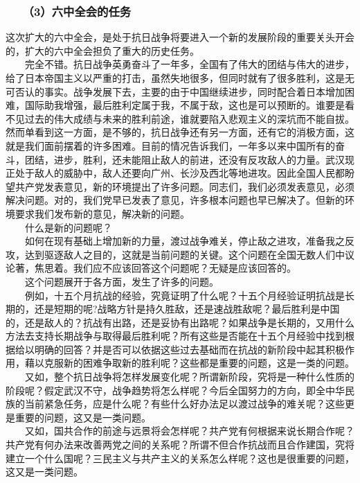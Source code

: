 \documentclass[cn,11pt,chinese]{elegantbook}
\def\myformat#1{\hfil\hfil #1}
\begin{document}
\subsubsection*{\myformat{　　（3）六中全会的任务}}
这次扩大的六中全会，是处于抗日战争将要进入一个新的发展阶段的重要关头开会的，扩大的六中全会担负了重大的历史任务。\\
　　完全不错。抗日战争英勇奋斗了一年多，全国有了伟大的团结与伟大的进步，给了日本帝国主义以严重的打击，虽然失地很多，但同时就有了很多胜利，这是无可否认的事实。战争发展下去，主要的由于中国继续进步，同时配合着日本增加困难，国际助我增强，最后胜利定属于我，不属于敌，这也是可以预断的。谁要是看不见过去的伟大成绩与未来的胜利前途，谁就要陷入悲观主义的深坑而不能自拔。然而单看到这一方面，是不够的，抗日战争还有另一方面，还有它的消极方面，这就是我们面前摆着的许多困难。目前的情况告诉我们，一年多以来中国所有的奋斗，团结，进步，胜利，还未能阻止敌人的前进，还没有反攻敌人的力量。武汉现正处于敌人的威胁中，敌人还要向广州、长沙及西北等地进攻。因此全国人民都盼望共产党发表意见，新的环境提出了许多问题。同志们，我们必须发表意见，必须解决问题。对的，我们党早已发表了意见，许多根本问题也早已解决了。但新的环境要求我们发布新的意见，解决新的问题。\\
　　什么是新的问题呢？\\
　　如何在现有基础上增加新的力量，渡过战争难关，停止敌之进攻，准备我之反攻，达到驱逐敌人之目的，这就是当前问题的关键。这个问题在全国无数人们中议论著，焦思着。我们应不应该回答这个问题呢？无疑是应该回答的。\\
　　这个问题展开于各方面，发生了许多的问题。\\
　　例如，十五个月抗战的经验，究竟证明了什么呢？十五个月经验证明抗战是长期的，还是短期的呢?战略方针是持久胜敌，还是速战胜敌呢？最后胜利是中国的，还是敌人的？抗战有出路，还是妥协有出路呢？如果战争是长期的，又用什么方法去支持长期战争与取得最后胜利呢？所有这些是否能在十五个月经验中找到根据给以明确的回答？并是否可以依据这些过去基础而在抗战的新阶段中起其积极作用，藉以克服新的困难争取新的胜利呢？这些都是重要的问题，这是一类的问题。\\
　　又如，整个抗日战争将怎样发展变化呢？所谓新阶段，究将是一种什么性质的阶段呢？假定武汉不守，战争趋势将怎么样呢？今后全国努力的方向，即全中华民族的当前紧急任务，应是什么呢？有些什么好办法足以渡过战争的难关呢？这些更是重要的问题，这又是一类问题。\\
　　又如，国共合作的前途与远景将会怎样呢？共产党有何根据来说长期合作呢？共产党有何办法来改善两党之间的关系呢？所谓不但合作抗战而且合作建国，究将建立一个什么国呢？三民主义与共产主义的关系怎么样呢？这也是很重要的问题，这又是一类问题。\\
\end{document}
